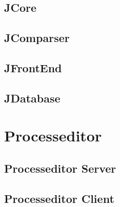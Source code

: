 \documentclass{acm_proc_article-sp}
\begin{document}
%
%
\subsection{JCore}

%
%
\subsection{JComparser}

%
%
\subsection{JFrontEnd}

%
%
\subsection{JDatabase}

%
%
\section{Processeditor}

%
%
\subsection{Processeditor Server}


%
%
\subsection{Processeditor Client}


%
%

%
 

%
%
\end{document}
